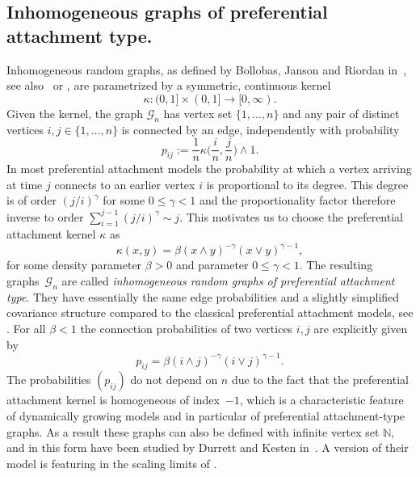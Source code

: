 \documentclass[12pt,a4paper]{article}
\numberwithin{equation}{section}
\begin{document}
\subsection{Inhomogeneous graphs of preferential attachment type.}\label{sec:definition}


Inhomogeneous random graphs, as defined by Bollobas, Janson and Riordan in~\cite{rjb}, see also~\cite[Chapter 3.2]{rg2} or \cite{söd}, are parametrized by a symmetric, continuous kernel
$$\kappa \colon (0,1] \times (0,1] \to [0,\infty).$$
Given the kernel, the graph $\mathscr G_n$ has vertex set $\{1,\ldots,n\}$ and any pair of distinct vertices $i,j\in\{1,\ldots,n\}$ is connected by an edge, independently with probability
$$p_{ij}:=\frac1n \kappa \Big( \frac{i}n, \frac{j}n \Big) \wedge 1.$$
In most preferential attachment models the probability at which a vertex arriving at time $j$ connects to an earlier vertex $i$ is proportional to its degree. This degree is of order $(j/i)^\gamma$
for some $0\leq \gamma<1$ 
and the proportionality factor therefore inverse to order $\sum_{i=1}^{j-1} (j/i)^\gamma \sim j$. This motivates us to choose the preferential attachment kernel $\kappa$ as
$$\kappa(x,y)=\beta (x\wedge y)^{-\gamma}(x\vee y)^{\gamma-1},$$
for some density parameter $\beta>0$ and parameter $0\leq \gamma<1$. The resulting graphs~$\mathscr G_n$ are called \emph{inhomogeneous random graphs of preferential attachment type}.
{They have essentially the same edge probabilities and a slightly simplified covariance structure compared to the classical preferential attachment models, see \cite{rg1, rg2}. }
For all
$\beta<1$ the connection probabilities of two vertices $i,j$ are explicitly given by
$$p_{ij}= \beta (i\wedge j)^{-\gamma}(i\vee j)^{\gamma-1}.$$
The probabilities $(p_{ij})$ do not depend on $n$
due to the fact that the preferential attachment kernel is homogeneous of index~$-1$, which is a characteristic feature of dynamically growing models and in particular of preferential attachment-type graphs. As a result these graphs can also be defined with infinite vertex set $\mathbb N$, and in this form have been studied by Durrett and Kesten in~\cite{DK}. A version of their model  is featuring in the scaling limits of \cite{BDH}.\smallskip
\end{document}
